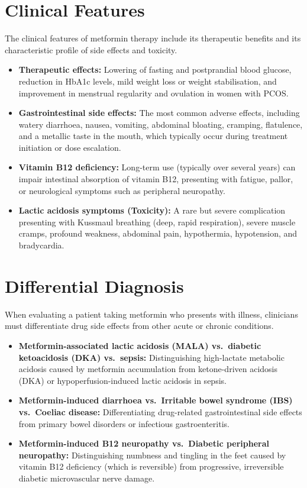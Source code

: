 \section*{Clinical Features}
The clinical features of metformin therapy include its therapeutic benefits and its characteristic profile of side effects and toxicity.
\begin{itemize}
    \item \textbf{Therapeutic effects:} Lowering of fasting and postprandial blood glucose, reduction in HbA1c levels, mild weight loss or weight stabilisation, and improvement in menstrual regularity and ovulation in women with PCOS.
    \item \textbf{Gastrointestinal side effects:} The most common adverse effects, including watery diarrhoea, nausea, vomiting, abdominal bloating, cramping, flatulence, and a metallic taste in the mouth, which typically occur during treatment initiation or dose escalation.
    \item \textbf{Vitamin B12 deficiency:} Long-term use (typically over several years) can impair intestinal absorption of vitamin B12, presenting with fatigue, pallor, or neurological symptoms such as peripheral neuropathy.
    \item \textbf{Lactic acidosis symptoms (Toxicity):} A rare but severe complication presenting with Kussmaul breathing (deep, rapid respiration), severe muscle cramps, profound weakness, abdominal pain, hypothermia, hypotension, and bradycardia.
\end{itemize}

\section*{Differential Diagnosis}
When evaluating a patient taking metformin who presents with illness, clinicians must differentiate drug side effects from other acute or chronic conditions.
\begin{itemize}
    \item \textbf{Metformin-associated lactic acidosis (MALA) vs.\ diabetic ketoacidosis (DKA) vs.\ sepsis:} Distinguishing high-lactate metabolic acidosis caused by metformin accumulation from ketone-driven acidosis (DKA) or hypoperfusion-induced lactic acidosis in sepsis.
    \item \textbf{Metformin-induced diarrhoea vs.\ Irritable bowel syndrome (IBS) vs.\ Coeliac disease:} Differentiating drug-related gastrointestinal side effects from primary bowel disorders or infectious gastroenteritis.
    \item \textbf{Metformin-induced B12 neuropathy vs.\ Diabetic peripheral neuropathy:} Distinguishing numbness and tingling in the feet caused by vitamin B12 deficiency (which is reversible) from progressive, irreversible diabetic microvascular nerve damage.
\end{itemize}

